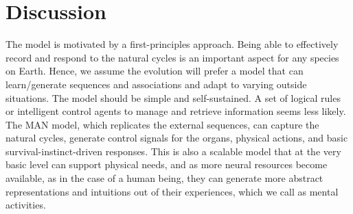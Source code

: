 \documentclass[reprint,amsmath,amssymb,apr,aip,onecolumn, 11pt]{revtex4-1}
\begin{document}


	

	
	
	\section{Discussion}
	
The model is motivated by a first-principles approach. Being able to effectively record and respond to the natural cycles is an important aspect for any species on Earth. Hence, we assume the evolution will prefer a model that can learn/generate sequences and associations and adapt to varying outside situations. The model should be simple and self-sustained. A set of logical rules or intelligent control agents to manage and retrieve information seems less likely. The MAN model, which replicates the external sequences, can capture the natural cycles, generate control signals for the organs, physical actions, and basic survival-instinct-driven responses. This is also a scalable model that at the very basic level can support physical needs, and as more neural resources become available, as in the case of a human being, they can generate more abstract representations and intuitions out of their experiences, which we call as mental activities. 
\end{document}
